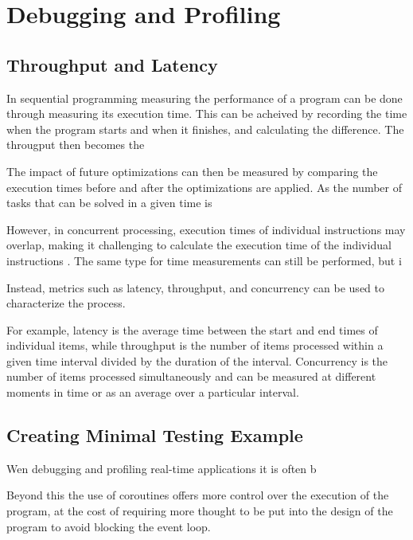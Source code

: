 
\section{Debugging and Profiling}

\subsection{Throughput and Latency}
In sequential programming measuring the performance of a program can be done through measuring its execution time.
This can be acheived by recording the time when the program starts and when it finishes, and calculating the difference.
The througput then becomes the

The impact of future optimizations can then be measured by comparing the execution times before and after the optimizations are applied.
As the number of tasks that can be solved in a given time is

However, in concurrent processing, execution times of individual instructions may overlap, making it challenging to calculate the execution time of the individual instructions \cite[21]{volkovLatencyHiding2016}.
The same type for time measurements can still be performed, but i

Instead, metrics such as latency, throughput, and concurrency can be used to characterize the process.

For example, latency is the average time between the start and end times of individual items, while throughput is the number of items processed within a given time interval divided by the duration of the interval.
Concurrency is the number of items processed simultaneously and can be measured at different moments in time or as an average over a particular interval.

\subsection{Creating Minimal Testing Example}
Wen debugging and profiling real-time applications it is often b

Beyond this the use of coroutines offers more control over the execution of the program, at the cost of requiring more thought to be put into the design of the program to avoid blocking the event loop.






